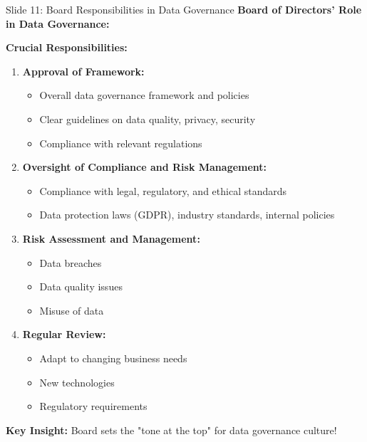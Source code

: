 \documentclass[8pt]{beamer}
\begin{document}
	\begin{frame}{Slide 11: Board Responsibilities in Data Governance}
		\fontsize{6.5}{7.5}\selectfont
		\textbf{Board of Directors' Role in Data Governance:}
		
		\vspace{0.1cm}
		\textbf{Crucial Responsibilities:}
		\begin{enumerate}
			\item \textbf{Approval of Framework:}
			\begin{itemize}
				\item Overall data governance framework and policies
				\item Clear guidelines on data quality, privacy, security
				\item Compliance with relevant regulations
			\end{itemize}
			\item \textbf{Oversight of Compliance and Risk Management:}
			\begin{itemize}
				\item Compliance with legal, regulatory, and ethical standards
				\item Data protection laws (GDPR), industry standards, internal policies
			\end{itemize}
			\item \textbf{Risk Assessment and Management:}
			\begin{itemize}
				\item Data breaches
				\item Data quality issues
				\item Misuse of data
			\end{itemize}
			\item \textbf{Regular Review:}
			\begin{itemize}
				\item Adapt to changing business needs
				\item New technologies
				\item Regulatory requirements
			\end{itemize}
		\end{enumerate}
		
		\textcolor{myblue}{\textbf{Key Insight:}} Board sets the \textcolor{myblue}{"tone at the top"} for data governance culture!
	\end{frame}
	
\end{document}
